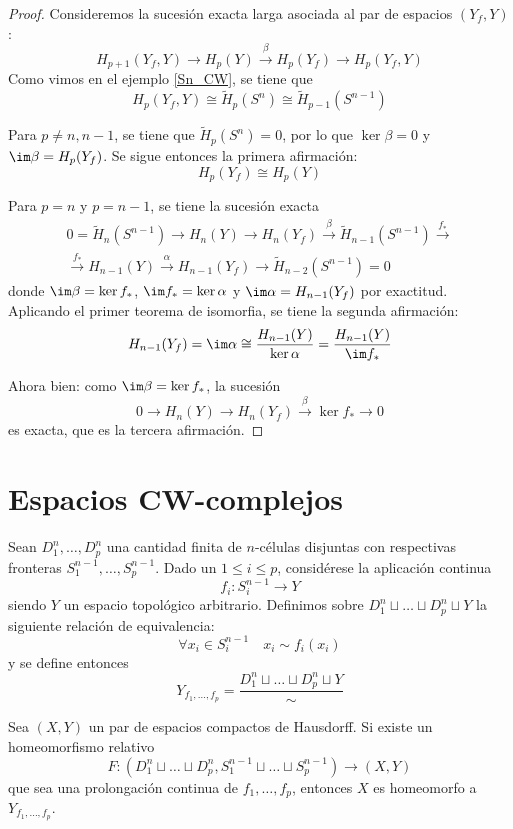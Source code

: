\begin{proof}
Consideremos la sucesión exacta larga asociada al par de espacios $(Y_f,Y)$: $$H_{p+1}(Y_f,Y) \longrightarrow H_p(Y) \xrightarrow{\beta} H_p(Y_f) \longrightarrow H_p(Y_f,Y)$$ Como vimos en el ejemplo \ref{Sn_CW}, se tiene que $$H_p(Y_f,Y)\cong \tilde{H}_p(S^n) \cong \tilde{H}_{p-1}(S^{n-1})$$

Para $p\neq n,n-1$, se tiene que $\tilde{H}_p(S^n)=0$, por lo que $\ker \beta=0$ y $\im \beta=H_p(Y_f)$. Se sigue entonces la primera afirmación: $$H_p(Y_f) \cong H_p(Y)$$

Para $p=n$ y $p=n-1$, se tiene la sucesión exacta \begin{multline*}
0=\tilde{H}_n(S^{n-1}) \longrightarrow H_n(Y) \longrightarrow H_n(Y_f) \xrightarrow{\beta} \tilde{H}_{n-1}(S^{n-1}) \xrightarrow{f_*} \\ \xrightarrow{f_*} H_{n-1}(Y) \xrightarrow{\alpha} H_{n-1}(Y_f)\longrightarrow \tilde{H}_{n-2}(S^{n-1})=0
\end{multline*}
donde $\im \beta=\ker f_*$, $\im f_*=\ker \alpha$ y $\im \alpha=H_{n-1}(Y_f)$ por exactitud. Aplicando el primer teorema de isomorfia, se tiene la segunda afirmación: $$H_{n-1}(Y_f)=\im \alpha \cong \frac{H_{n-1}(Y)}{\ker \alpha}=\frac{H_{n-1}(Y)}{\im f_*}$$

Ahora bien: como $\im \beta=\ker f_*$, la sucesión $$0 \longrightarrow H_n(Y) \longrightarrow H_n(Y_f) \xrightarrow{\beta} \ker f_* \longrightarrow 0$$ es exacta, que es la tercera afirmación.
\end{proof}

\section{Espacios CW-complejos}
Sean $D_1^n,\dots, D_p^n$ una cantidad finita de $n$-células disjuntas con respectivas fronteras $S^{n-1}_1,\dots,S^{n-1}_p$. Dado un $1 \leq i \leq p$, considérese la aplicación continua $$f_i: S^{n-1}_i \longrightarrow Y$$ siendo $Y$ un espacio topológico arbitrario. Definimos sobre $D^n_1\sqcup \dots \sqcup D^n_p\sqcup Y$ la siguiente relación de equivalencia: $$\forall x_i \in S^{n-1}_i \quad x_i \sim f_i(x_i)$$ y se define entonces $$Y_{f_1,\dots,f_p}=\frac{D^n_1\sqcup \dots \sqcup D^n_p\sqcup Y}{\sim}$$

\begin{prop} Sea $(X,Y)$ un par de espacios compactos de Hausdorff. Si existe un homeomorfismo relativo $$F: (D^n_1\sqcup \dots \sqcup D^n_p, S^{n-1}_1\sqcup \dots \sqcup S^{n-1}_p) \longrightarrow (X,Y)$$ que sea una prolongación continua de $f_1,\dots,f_p$, entonces $X$ es homeomorfo a $Y_{f_1,\dots,f_p}$.\end{prop}

